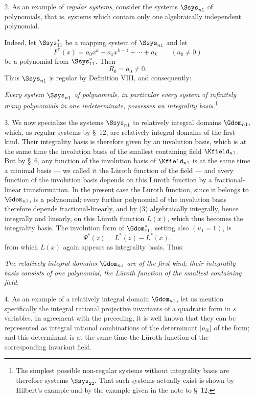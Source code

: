 \documentclass[11pt]{article}
\begin{document}
2. As an example of \emph{regular systems}, consider the systems $\Ssys_{n1}$ of polynomials, that is, systems which contain only one algebraically independent polynomial.

Indeed, let $\Ssys^*_{11}$ be a mapping system of $\Ssys_{n1}$ and let
\[
  F^*(x)=a_0x^k+a_1x^{k-1}+\cdots+a_k\qquad(a_0\ne0)
\]
be a polynomial from $\Ssys^*_{11}$. Then
\begin{equation}
  R_0=a_0\ne0.
\tag{3}
\end{equation}
Thus $\Ssys_{n1}$ is regular by Definition VIII, and consequently:

\emph{Every system $\Ssys_{n1}$ of polynomials, in particular every system of infinitely many polynomials in one indeterminate, possesses an integrality basis.}\footnote{The simplest possible non-regular systems without integrality basis are therefore systems $\Ssys_{22}$. That such systems actually exist is shown by Hilbert's example and by the example given in the note to \S\ 12.}

3. We now specialize the systems $\Ssys_{n1}$ to relatively integral domains $\Gdom_{n1}$, which, as regular systems by \S\ 12, are relatively integral domains of the first kind. Their integrality basis is therefore given by an involution basis, which is at the same time the involution basis of the smallest containing field $\Kfield_{n1}$. But by \S\ 6, any function of the involution basis of $\Kfield_{n1}$ is at the same time a minimal basis --- we called it the Lüroth function of the field --- and every function of the involution basis depends on this Lüroth function by a fractional-linear transformation. In the present case the Lüroth function, since it belongs to $\Gdom_{n1}$, is a polynomial; every further polynomial of the involution basis therefore depends fractional-linearly, and by (3) algebraically integrally, hence integrally and linearly, on this Lüroth function $L(x)$, which thus becomes the integrality basis. The involution form of $\Gdom^*_{11}$, setting also $(u_1=1)$, is
\[
  \Psi^*(z)=L^*(z)-L^*(x),
\]
from which $L(x)$ again appears as integrality basis. Thus:

\emph{The relatively integral domains $\Gdom_{n1}$ are of the first kind; their integrality basis consists of one polynomial, the Lüroth function of the smallest containing field.}

4. As an example of a relatively integral domain $\Gdom_{n1}$, let us mention specifically the integral rational projective invariants of a quadratic form in $s$ variables. In agreement with the preceding, it is well known that they can be represented as integral rational combinations of the determinant $|a_{ik}|$ of the form; and this determinant is at the same time the Lüroth function of the corresponding invariant field.
\end{document}
